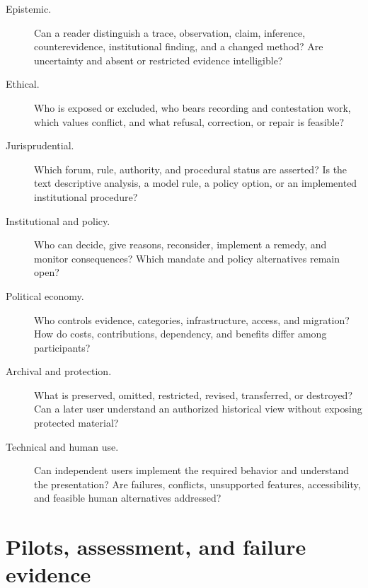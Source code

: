 \documentclass[11pt,a4paper]{article}
\begin{document}
\begin{description}
\item[Epistemic.] Can a reader distinguish a trace, observation, claim, inference, counterevidence, institutional finding, and a changed method? Are uncertainty and absent or restricted evidence intelligible?
\item[Ethical.] Who is exposed or excluded, who bears recording and contestation work, which values conflict, and what refusal, correction, or repair is feasible?
\item[Jurisprudential.] Which forum, rule, authority, and procedural status are asserted? Is the text descriptive analysis, a model rule, a policy option, or an implemented institutional procedure?
\item[Institutional and policy.] Who can decide, give reasons, reconsider, implement a remedy, and monitor consequences? Which mandate and policy alternatives remain open?
\item[Political economy.] Who controls evidence, categories, infrastructure, access, and migration? How do costs, contributions, dependency, and benefits differ among participants?
\item[Archival and protection.] What is preserved, omitted, restricted, revised, transferred, or destroyed? Can a later user understand an authorized historical view without exposing protected material?
\item[Technical and human use.] Can independent users implement the required behavior and understand the presentation? Are failures, conflicts, unsupported features, accessibility, and feasible human alternatives addressed?
\end{description}



\section{Pilots, assessment, and failure evidence}
\end{document}
